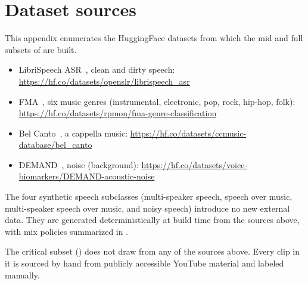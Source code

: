 \chapter{Dataset sources}
\label{apx:dataset_sources}

This appendix enumerates the HuggingFace datasets from which the mid and full subsets of  are built.

\begin{itemize}
    \item LibriSpeech ASR~\cite{panayotov2015librispeech}, clean and dirty speech: \url{https://hf.co/datasets/openslr/librispeech_asr}
    \item FMA~\cite{defferrard2017fma}, six music genres (instrumental, electronic, pop, rock, hip-hop, folk): \url{https://hf.co/datasets/rpmon/fma-genre-classification}
    \item Bel Canto~\cite{zhou2025ccmusic}, a cappella music: \url{https://hf.co/datasets/ccmusic-database/bel_canto}
    \item DEMAND~\cite{thiemann2013demand}, noise (background): \url{https://hf.co/datasets/voice-biomarkers/DEMAND-acoustic-noise}
\end{itemize}

The four synthetic speech subclasses (multi-speaker speech, speech over music, multi-speaker speech over music, and noisy speech) introduce no new external data.
They are generated deterministically at build time from the sources above, with mix policies summarized in .

The critical subset () does not draw from any of the sources above.
Every clip in it is sourced by hand from publicly accessible YouTube material and labeled manually.
